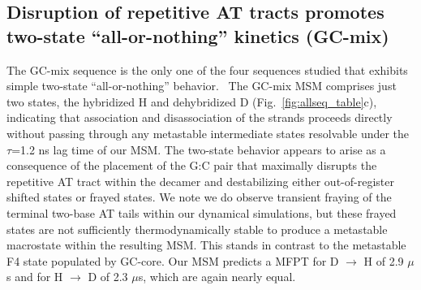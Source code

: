 \documentclass[journal=jpcbfk,manuscript=article]{achemso}
\begin{document}




\subsection{Disruption of repetitive AT tracts promotes two-state ``all-or-nothing'' kinetics (GC-mix)}

The GC-mix sequence is the only one of the four sequences studied that exhibits simple two-state ``all-or-nothing'' behavior.~\citep{Xiao2019, Araque2016LatticeCooperativity, Sikora2013ModelingIntermediates, Sanstead2016} The GC-mix MSM comprises just two states, the hybridized H and dehybridized D (Fig.~\ref{fig:allseq_table}c), indicating that association and disassociation of the strands proceeds directly without passing through any metastable intermediate states resolvable under the $\tau$=1.2 ns lag time of our MSM. The two-state behavior appears to arise as a consequence of the placement of the G:C pair that maximally disrupts the repetitive AT tract within the decamer and destabilizing either out-of-register shifted states or frayed states. We note we do observe transient fraying of the terminal two-base AT tails within our dynamical simulations, but these frayed states are not sufficiently thermodynamically stable to produce a metastable macrostate within the resulting MSM. This stands in contrast to the metastable F4 state populated by GC-core. Our MSM predicts a MFPT for D $\rightarrow$ H of 2.9 $\mu$s and for H $\rightarrow$ D of 2.3 $\mu$s, which are again nearly equal.
\end{document}
